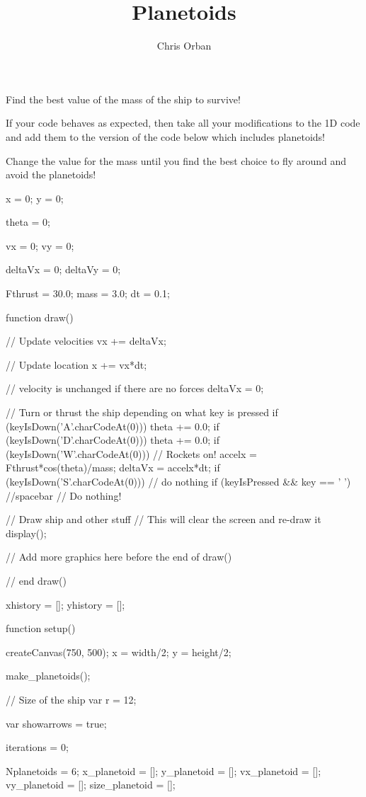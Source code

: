 \documentclass{ximera}
\author{Chris Orban}
\title{Planetoids}
\begin{document}
\maketitle

Find the best value of the mass of the ship to survive!

If your code behaves as expected, then take all your modifications to
the 1D code and add them to the version of the code below which
includes planetoids!

Change the value for the mass until you find the best choice to fly
around and avoid the planetoids!

\begin{javascriptCode}
  x = 0;
y = 0;

theta = 0;

vx = 0;
vy = 0;

deltaVx = 0;
deltaVy = 0;

Fthrust = 30.0;
mass = 3.0;
dt = 0.1;

function draw(){
    // Update velocities
    vx += deltaVx;

    // Update location
    x += vx*dt;

    // velocity is unchanged if there are no forces
    deltaVx = 0;
    
    // Turn or thrust the ship depending on what key is pressed
    if (keyIsDown('A'.charCodeAt(0))) {
        theta += 0.0;
    }
    if (keyIsDown('D'.charCodeAt(0))) {
        theta += 0.0;
    }
    if (keyIsDown('W'.charCodeAt(0))) {
        // Rockets on!
        accelx = Fthrust*cos(theta)/mass;
        deltaVx = accelx*dt;
    }
    if (keyIsDown('S'.charCodeAt(0))) {
            // do nothing
    }
    if (keyIsPressed && key == ' '){ //spacebar
			// Do nothing!
    }

    // Draw ship and other stuff
    // This will clear the screen and re-draw it
    display();

    // Add more graphics here before the end of draw()

  } // end draw()

  xhistory = [];
yhistory = [];

function setup(){
    createCanvas(750, 500);
    x = width/2;
    y = height/2;

    make_planetoids();
}

// Size of the ship
var r = 12;

var showarrows = true;

iterations = 0;

Nplanetoids = 6;
x_planetoid = [];
y_planetoid = [];
vx_planetoid = [];
vy_planetoid = [];
size_planetoid = [];


\end{javascriptCode}
\end{document}
